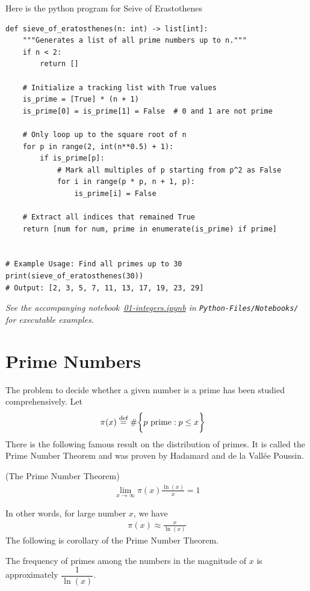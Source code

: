 \documentclass[a4paper, 12pt]{book} %
\newcommand{\notebook}[1]{\begingroup\small\itshape
    See the accompanying notebook~\href{run:./Python-Files/Notebooks/#1}{#1} in \texttt{Python-Files/Notebooks/} for executable examples.%
\endgroup}
\begin{document}
Here is the python program for Seive of Erastothenes
\begin{verbatim}
def sieve_of_eratosthenes(n: int) -> list[int]:
    """Generates a list of all prime numbers up to n."""
    if n < 2:
        return []

    # Initialize a tracking list with True values
    is_prime = [True] * (n + 1)
    is_prime[0] = is_prime[1] = False  # 0 and 1 are not prime

    # Only loop up to the square root of n
    for p in range(2, int(n**0.5) + 1):
        if is_prime[p]:
            # Mark all multiples of p starting from p^2 as False
            for i in range(p * p, n + 1, p):
                is_prime[i] = False

    # Extract all indices that remained True
    return [num for num, prime in enumerate(is_prime) if prime]


# Example Usage: Find all primes up to 30
print(sieve_of_eratosthenes(30))
# Output: [2, 3, 5, 7, 11, 13, 17, 19, 23, 29]
\end{verbatim}

\notebook{01-integers.ipynb}

\section{Prime Numbers}
The problem to decide whether a given number is a prime has been studied comprehensively. 
Let
\begin{align}
    \pi(x) &\overset{\text{def}}{=} \#\bigg\{ p~\text{prime}: p \leq x\bigg\}
\end{align}
There is the following famous result on the distribution of primes. It is called the Prime Number Theorem and was proven by Hadamard and
de la Vall\'ee Poussin.
\begin{theorem}
    (The Prime Number Theorem) 
    \begin{align}
        \lim_{x \rightarrow \infty} \pi(x) \frac{\ln(x)}{x} = 1
    \end{align}
\end{theorem}

In other words, for large number $x$, we have 
\begin{align}
    \pi(x) \approx \frac{x}{\ln(x)}
\end{align}
The following is corollary of the Prime Number Theorem.


\begin{corollary}
    The frequency of primes among the numbers in the magnitude of $x$ is approximately  $\dfrac{1}{\ln(x)}$.
\end{corollary}
\end{document}
